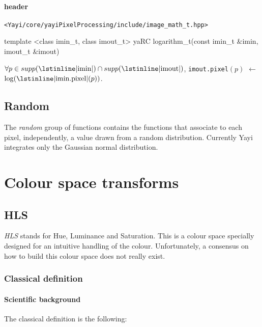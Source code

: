 \paragraph{header} \lstinline|<Yayi/core/yayiPixelProcessing/include/image_math_t.hpp>|

\begin{cpp}
template <class imin_t, class imout_t>
yaRC logarithm_t(const imin_t &imin, imout_t &imout)
\end{cpp}

$\forall p \in supp(\text{\lstinline|imin|}) \cap supp(\text{\lstinline|imout|})$, \lstinline|imout.pixel|$(p)$ $\leftarrow$  $\log (\text{\lstinline|imin.pixel|}(p) )$. 

\subsection{Random}
\label{sub:random}
The \textit{random} group of functions contains the functions that associate to each pixel, independently, a value drawn from a random distribution. Currently Yayi integrates only the Gaussian normal distribution. 



\newpage

\section{Colour space transforms}
\label{sub:color_space_transforms}

\subsection{HLS}
\textit{HLS} stands for Hue, Luminance and Saturation. This is a colour space specially designed for an intuitive handling of the colour. Unfortunately, a  consensus on how to build this colour space does not really exist. 

\subsubsection{Classical definition}


\paragraph{Scientific background}
The classical definition is the following:

